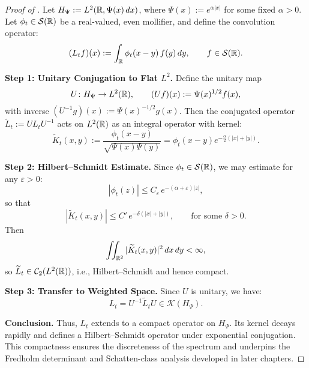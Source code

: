 \begin{proof}[Proof of ]
Let \( H_\Psi := L^2(\mathbb{R}, \Psi(x)\, dx) \), where \( \Psi(x) := e^{\alpha |x|} \) for some fixed \( \alpha > 0 \). Let \( \phi_t \in \mathcal{S}(\mathbb{R}) \) be a real-valued, even mollifier, and define the convolution operator:
\[
(L_t f)(x) := \int_{\mathbb{R}} \phi_t(x - y)\, f(y)\, dy, \qquad f \in \mathcal{S}(\mathbb{R}).
\]

\medskip
\noindent\textbf{Step 1: Unitary Conjugation to Flat \( L^2 \).}
Define the unitary map
\[
U \colon H_\Psi \to L^2(\mathbb{R}), \qquad (Uf)(x) := \Psi(x)^{1/2} f(x),
\]
with inverse \( (U^{-1} g)(x) := \Psi(x)^{-1/2} g(x) \). Then the conjugated operator \( \widetilde{L}_t := U L_t U^{-1} \) acts on \( L^2(\mathbb{R}) \) as an integral operator with kernel:
\[
\widetilde{K}_t(x,y) := \frac{\phi_t(x - y)}{\sqrt{\Psi(x)\Psi(y)}} = \phi_t(x - y) e^{-\frac{\alpha}{2}(|x| + |y|)}.
\]

\medskip
\noindent\textbf{Step 2: Hilbert--Schmidt Estimate.}
Since \( \phi_t \in \mathcal{S}(\mathbb{R}) \), we may estimate for any \( \varepsilon > 0 \):
\[
|\phi_t(z)| \le C_\varepsilon\, e^{-(\alpha + \varepsilon)|z|},
\]
so that
\[
|\widetilde{K}_t(x,y)| \le C'\, e^{-\delta(|x| + |y|)}, \qquad \text{for some } \delta > 0.
\]
Then
\[
\iint_{\mathbb{R}^2} |\widetilde{K}_t(x,y)|^2\, dx\, dy < \infty,
\]
so \( \widetilde{L}_t \in \mathcal{C}_2(L^2(\mathbb{R})) \), i.e., Hilbert--Schmidt and hence compact.

\medskip
\noindent\textbf{Step 3: Transfer to Weighted Space.}
Since \( U \) is unitary, we have:
\[
L_t = U^{-1} \widetilde{L}_t U \in \mathcal{K}(H_\Psi).
\]

\medskip
\noindent\textbf{Conclusion.}
Thus, \( L_t \) extends to a compact operator on \( H_\Psi \). Its kernel decays rapidly and defines a Hilbert--Schmidt operator under exponential conjugation. This compactness ensures the discreteness of the spectrum and underpins the Fredholm determinant and Schatten-class analysis developed in later chapters.
\end{proof}
